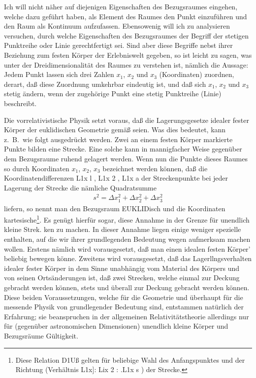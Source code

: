 Ich will nicht näher auf diejenigen Eigenschaften des Bezugsraumes eingehen, welche dazu geführt haben, als Element des Raumes den Punkt einzuführen und den Raum als Kontinuum aufzufassen. Ebensowenig will ich zu analysieren versuchen, durch welche Eigenschaften des Bezugsraumes der Begriff der stetigen Punktreihe oder Linie gerechtfertigt sei. Sind aber diese Begriffe nebst ihrer Beziehung zum festen Körper der Erlebniswelt gegeben, so ist leicht zu sagen, was unter der Dreidimensionalität des Raumes zu verstehen ist, nämlich die Aussage: Jedem Punkt lassen sich drei Zahlen $x_1$, $x_2$ und $x_3$ (Koordinaten) zuordnen, derart, daß diese Zuordnung umkehrbar eindeutig ist, und daß sich $x_1$, $x_2$ und $x_3$ stetig ändern, wenn der zugehörige Punkt eine stetig Punktreihe (Linie) beschreibt.

Die vorrelativistische Physik setzt voraus, daß die Lagerungsgesetze idealer fester Körper der euklidischen Geometrie gemäß seien. Was dies bedeutet, kann z.\ B.\ wie folgt ausgedrückt werden. Zwei an einem festen Körper markierte Punkte bilden eine Strecke. Eine solche kann in mannigfacher Weise gegenüber dem Bezugsraume ruhend gelagert werden. Wenn nun die Punkte dieses Raumes so durch Koordinaten $x_1$, $x_2$, $x_3$ bezeichnet werden können, daß die Koordinatendifferenzen L1x l , L1x 2 , L1x a der Streckenpunkte bei jeder Lagerung der Strecke die nämliche Quadratsumme
\begin{align}
    s^2 = \Delta x_1^2 + \Delta x_2^2 + \Delta x_3^2
\end{align}
liefern, so nennt man den Bezugsraum EUKLIDisch und die Koordinaten kartesische\footnote{Diese Relation D1Uß gelten für beliebige Wahl des Anfangspunktes und der Richtung (Verhältnis L1x]: Lix 2 : .L1x s ) der Strecke.}. Es genügt hierfür sogar, diese Annahme in der Grenze für unendlich kleine Strek. ken zu machen. In dieser Annahme liegen einige weniger spezielle enthalten, auf die wir ihrer grundlegenden Bedeutung wegen aufmerksam machen wollen. Erstens nämlich wird vorausgesetzt, daß man einen idealen festen Körper' beliebig bewegen könne. Zweitens wird vorausgesetzt, daß das Lagerllngsverhalten idealer fester Körper in dem Sinne unabhängig vom Material des Körpers und von seinen Ortsänderungen ist, daß zwei Strecken, welche einmal zur Deckung gebracht werden können, stets und überall zur Deckung gebracht werden können. Diese beiden Voraussetzungen, welche für die Geometrie und überhaupt für die messende Physik von grundlegender Bedeutung sind, entstammen natürlich der Erfahrung; sie beanspruchen in der allgemeinen Relativitätstheorie allerdings nur für (gegenüber astronomischen Dimensionen) unendlich kleine Körper und Bezugsräume Gültigkeit.

